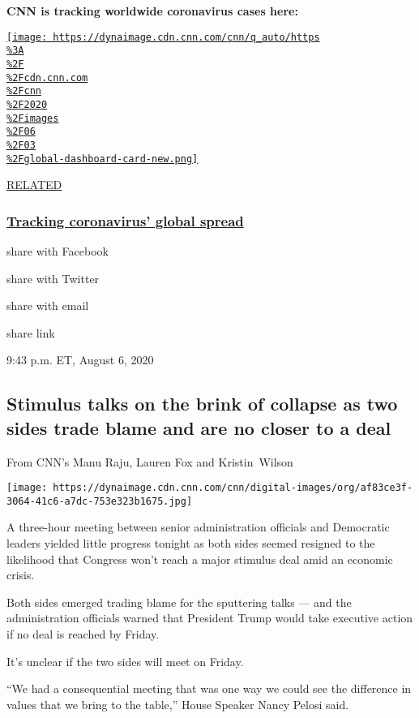 \textbf{CNN is tracking worldwide coronavirus cases here:}

\href{https://www.cnn.com/interactive/2020/health/coronavirus-maps-and-cases/}{\texttt{[image: https://dynaimage.cdn.cnn.com/cnn/q\_auto/https\\\%3A\\\%2F\\\%2Fcdn.cnn.com\\\%2Fcnn\\\%2F2020\\\%2Fimages\\\%2F06\\\%2F03\\\%2Fglobal-dashboard-card-new.png]}}

\href{}{RELATED}

\hypertarget{tracking-coronavirus-global-spread}{%
\subsubsection{\texorpdfstring{\href{https://www.cnn.com/interactive/2020/health/coronavirus-maps-and-cases/}{Tracking
coronavirus' global
spread}}{Tracking coronavirus' global spread}}\label{tracking-coronavirus-global-spread}}

share with Facebook

share with Twitter

share with email

share link

9:43 p.m. ET, August 6, 2020

\hypertarget{stimulus-talks-on-the-brink-of-collapse-as-two-sides-trade-blame-and-are-no-closer-to-a-deal}{%
\subsection{Stimulus talks on the brink of collapse as two sides trade
blame and are no closer to a
deal}\label{stimulus-talks-on-the-brink-of-collapse-as-two-sides-trade-blame-and-are-no-closer-to-a-deal}}

From CNN's Manu Raju, Lauren Fox and Kristin~Wilson

\texttt{[image: https://dynaimage.cdn.cnn.com/cnn/digital-images/org/af83ce3f-3064-41c6-a7dc-753e323b1675.jpg]}

A three-hour meeting between senior administration officials and
Democratic leaders yielded little progress tonight as both sides seemed
resigned to the likelihood that Congress won't reach a major stimulus
deal amid an economic crisis.

Both sides emerged trading blame for the sputtering talks --- and the
administration officials warned that President Trump would take
executive action if no deal is reached by Friday.~

It's unclear if the two sides will meet on Friday.~

``We had a consequential meeting that was one way we could see the
difference in values that we bring to the table,'' House Speaker Nancy
Pelosi said.

